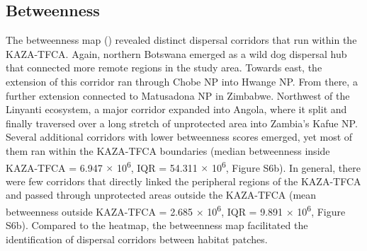\documentclass[abstract=on,10pt,a4paper,bibliography=totocnumbered]{article}
\begin{document}
\subsection{Betweenness}
The betweenness map () revealed distinct dispersal corridors
that run within the KAZA-TFCA. Again, northern Botswana emerged as a wild dog
dispersal hub that connected more remote regions in the study area. Towards
east, the extension of this corridor ran through Chobe NP into Hwange NP. From
there, a further extension connected to Matusadona NP in Zimbabwe. Northwest of
the Linyanti ecosystem, a major corridor expanded into Angola, where it split
and finally traversed over a long stretch of unprotected area into Zambia's
Kafue NP. Several additional corridors with lower betweenness scores emerged,
yet most of them ran within the KAZA-TFCA boundaries (median betweenness inside
KAZA-TFCA = 6.947 \(\times\) 10\textsuperscript{6}, IQR = 54.311 \(\times\)
10\textsuperscript{6}, Figure S6b). In general, there were few corridors that
directly linked the peripheral regions of the KAZA-TFCA and passed through
unprotected areas outside the KAZA-TFCA (mean betweenness outside KAZA-TFCA =
2.685 \(\times\) 10\textsuperscript{6}, IQR = 9.891 \(\times\)
10\textsuperscript{6}, Figure S6b). Compared to the heatmap, the betweenness map
facilitated the identification of dispersal corridors between habitat patches.

\end{document}

